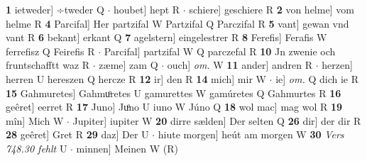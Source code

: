 \documentclass[8pt,a4paper,notitlepage]{article}
\begin{document}
\begin{table}[ht]
\begin{minipage}[t]{0.5\linewidth}
\textbf{1} ietweder] ÷tweder Q  $\cdot$ houbet] hept R  $\cdot$ schiere] geschiere R \textbf{2} von helme] vom helme R \textbf{4} Parcifal] Her partzifal W Partzifal Q Parczifal R \textbf{5} vant] gewan vnd vant R \textbf{6} bekant] erkant Q \textbf{7} agelstern] eingelestrer R \textbf{8} Ferefis] Ferafis W ferrefisz Q Feirefis R  $\cdot$ Parcifal] partzifal W Q parczefal R \textbf{10} Jn zwenie och fruntschafftt waz R  $\cdot$ zæme] zam Q  $\cdot$ ouch] \textit{om.} W \textbf{11} ander] andren R  $\cdot$ herzen] herren U hereszen Q hercze R \textbf{12} ir] den R \textbf{14} mich] mir W  $\cdot$ ie] \textit{om.} Q dich ie R \textbf{15} Gahmuretes] Gahmuͦretes U gamurettes W gamúretes Q Gahmurtes R \textbf{16} geêret] eerret R \textbf{17} Juno] Juͦno U iuno W Júno Q \textbf{18} wol mac] mag wol R \textbf{19} mîn] Mich W  $\cdot$ Jupiter] iupiter W \textbf{20} dirre sælden] Der selten Q \textbf{26} dir] der dir R \textbf{28} geêret] Gret R \textbf{29} daz] Der U  $\cdot$ hiute morgen] heút am morgen W \textbf{30} \textit{Vers 748.30 fehlt} U   $\cdot$ minnen] Meinen W (R) \newline
\end{minipage}
\end{table}
\end{document}
